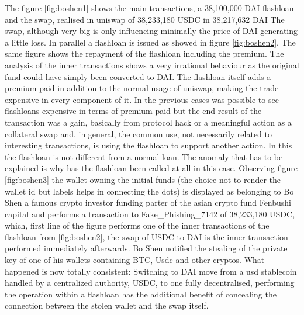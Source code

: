 \documentclass[11pt,a4paper,titlepage]{scrartcl}
\begin{document}
The figure \ref{fig:boshen1} shows the main transactions, a 38,100,000 DAI flashloan and the swap, realised in uniswap of 38,233,180 USDC in 38,217,632 DAI
The swap, although very big is only influencing minimally the price of DAI generating a little loss. In parallel a flashloan is issued as showed in figure  \ref{fig:boshen2}.
The same figure shows the repayment of the flashloan including the premium.
The analysis of the inner transactions shows a very irrational behaviour as the original fund could have simply been converted to DAI. The flashloan itself adds a premium paid in addition to the normal usage of uniswap, making the trade expensive in every component of it. In the previous cases was possible to see flashloans expensive in terms of premium paid but the end result of the transaction was a gain, basically from protocol hack or a meaningful action as a collateral swap and, in general, the common use, not necessarily related to interesting transactions, is using the flashloan to support another action. In this the flashloan is not different from a normal loan. The anomaly that has to be explained is why has the flashloan been called at all in this case. Observing figure  \ref{fig:boshen3}   the wallet owning the initial funds (the choice not to render the wallet id but labels helps in connecting the dots) is displayed as belonging to Bo Shen a famous crypto investor funding parter of the asian crypto fund Fenbushi capital and performs a transaction to Fake\_Phishing\_7142 of 38,233,180 USDC, which, first line of the figure performs one of the inner transactions of the flashloan from  \ref{fig:boshen2}, the swap of USDC to DAI is the inner transaction performed immediately  afterwards. Bo Shen notified  the stealing of the private key of one of his wallets containing BTC, Usdc and other cryptos. What happened is now totally consistent: Switching to DAI move from a usd stablecoin handled by a centralized authority, USDC, to one fully decentralised, performing the operation within a flashloan has the additional benefit of concealing the connection between the stolen wallet and the swap itself.
\end{document}
